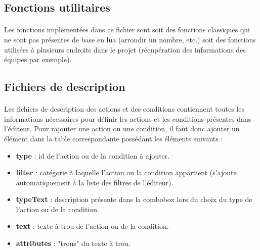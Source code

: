 \documentclass[a4paper]{article}
\begin{document}
\subsection{Fonctions utilitaires}
\paragraph{ }
Les fonctions implémentées dans ce fichier sont soit des fonctions classiques qui ne sont pas présentes de base en lua (arrondir un nombre, etc.) soit des fonctions utilisées à plusieurs endroits dans le projet (récupération des informations des équipes par exemple).
\subsection{Fichiers de description}
\paragraph{ } Les fichiers de description des actions et des conditions contiennent toutes les informations nécessaires pour définir les actions et les conditions présentes dans l'éditeur. Pour rajouter une action ou une condition, il faut donc ajouter un élément dans la table correspondante possédant les éléments suivants :
\begin{itemize}
\item \textbf{type} : id de l'action ou de la condition à ajouter.
\item \textbf{filter} : catégorie à laquelle l'action ou la condition appartient (s'ajoute automatiquement à la liste des filtres de l'éditeur).
\item \textbf{typeText} : description présente dans la combobox lors du choix du type de l'action ou de la condition.
\item \textbf{text} : texte à trou de l'action ou de la condition.
\item \textbf{attributes} : "trous" du texte à trou.
\end{itemize}
\end{document}
